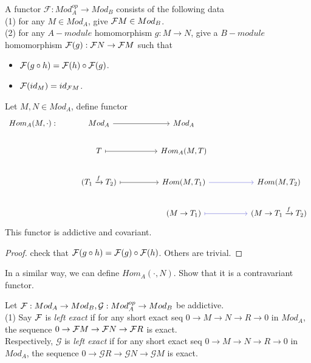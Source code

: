 \documentclass[11pt,fleqn]{book} %
\begin{document}
\begin{CJK}{UTF8}{gkai}
\begin{definition}
	 A functor $\mathcal{F}:Mod_A^{op} \to Mod_B$ consists of the following data \\
	(1) for any $M\in Mod_A$, give $\mathcal{F} M \in Mod_B$. \\
	(2) for any $A-module$ homomorphism $g:M\to N$, give a $B-module$ homomorphism $\mathcal{F} (g) : \mathcal{F} N \to \mathcal{F} M$ such that 
	\begin{itemize}
		\item $\mathcal{F}(g\circ h) = \mathcal{F}(h)\circ \mathcal{F}(g)$.
		\item $\mathcal{F}(id_M) = id_{\mathcal{F} M}$.
	\end{itemize} 	
\end{definition}

\begin{example}
	Let $M,N \in Mod_A$, define functor 
	\[\begin{tikzcd}
		{Hom_A(M,\cdot):} & {Mod_A} && {Mod_A} \\
		& T && {Hom_A(M,T)} \\
		& {(T_1\xrightarrow{f}T_2)} && {Hom(M,T_1)} && {Hom(M,T_2)} \\
		&&& {(M\to T_1)} && {(M\to T_1 \xrightarrow{f}T_2)}
		\arrow[from=1-2, to=1-4]
		\arrow[maps to, from=2-2, to=2-4]
		\arrow[color={rgb,255:red,92;green,92;blue,214}, from=3-4, to=3-6]
		\arrow[color={rgb,255:red,92;green,92;blue,214}, maps to, from=4-4, to=4-6]
		\arrow[maps to, from=3-2, to=3-4]
	\end{tikzcd}\]
	This functor is addictive and covariant.
\end{example}

\begin{proof}
	check that $\mathcal{F}(g\circ h) = \mathcal{F}(g)\circ \mathcal{F}(h)$. Others are trivial.
\end{proof}

\begin{example}
	In a similar way, we can define $Hom_A(\cdot,N)$. Show that it is a contravariant functor.
\end{example}

\newcommand{\mcg}{\mathcal{G}}
\begin{definition}
	 Let $\mcf:Mod_A \to Mod_B, \mcg:Mod_A^{op}\to Mod_B$ be addictive. \\
	(1) Say $\mathcal{F}$ is {\it left exact} if for any short exact seq $0\to M\to N\to R \to 0$ in $Mod_A$, the sequence $0\to \mathcal{F} M\to \mathcal{F} N \to \mathcal{F} R$ is exact. \\
		Respectively, $\mcg$ is {\it left exact} if for any short exact seq $0\to M\to N\to R \to 0$ in $Mod_A$, the sequence $0\to \mcg R\to \mcg N \to \mcg M$ is exact.
	

\end{definition}
\end{CJK}
\end{document}
